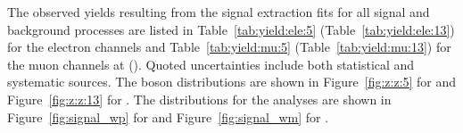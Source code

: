 The observed yields resulting from the signal extraction fits for all signal and background processes are listed in Table~\ref{tab:yield:ele:5} (Table~\ref{tab:yield:ele:13}) for the electron channels and Table~\ref{tab:yield:mu:5} (Table~\ref{tab:yield:mu:13}) for the muon channels at \sg (\sh). Quoted uncertainties include both statistical and systematic sources. The \Z boson \mll distributions are shown in Figure~\ref{fig:z:z:5} for \sg and Figure~\ref{fig:z:z:13} for \sh. The \mt distributions for the \W analyses are shown in Figure~\ref{fig:signal_wp} for \Wp and Figure~\ref{fig:signal_wm} for \Wm.

 







